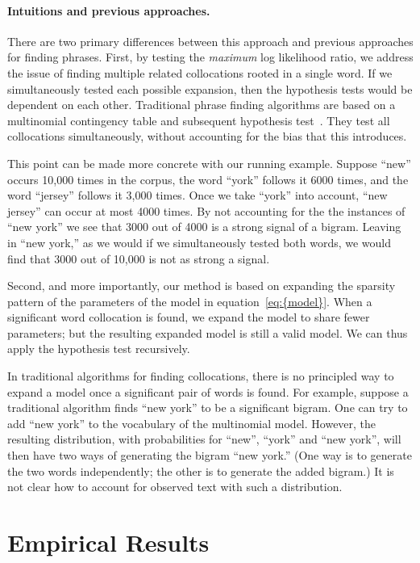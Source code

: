 \documentclass[11pt]{article}
\begin{document}
\paragraph{Intuitions and previous approaches.}

There are two primary differences between this approach and previous
approaches for finding phrases.  First, by testing the
\textit{maximum} log likelihood ratio, we address the issue of finding
multiple related collocations rooted in a single word.  If we
simultaneously tested each possible expansion, then the hypothesis
tests would be dependent on each other.  Traditional phrase finding
algorithms are based on a multinomial contingency table and subsequent
hypothesis test~\citep{Manning:1999}.  They test all collocations
simultaneously, without accounting for the bias that this introduces.

This point can be made more concrete with our running example.  Suppose
``new'' occurs 10,000 times in the corpus, the word ``york'' follows
it 6000 times, and the word ``jersey'' follows it 3,000 times.  Once we
take ``york'' into account, ``new jersey'' can occur at most 4000
times.  By not accounting for the the instances of ``new york'' we see
that 3000 out of 4000 is a strong signal of a bigram.  Leaving in
``new york,'' as we would if we simultaneously tested both words, we
would find that 3000 out of 10,000 is not as strong a signal.

Second, and more importantly, our method is based on expanding the
sparsity pattern of the parameters of the model in {equation~\eqref{eq:{model}}}.  When
a significant word collocation is found, we expand the model to share
fewer parameters; but the resulting expanded model is still a valid
model.  We can thus apply the hypothesis test recursively.

In traditional algorithms for finding collocations, there is no
principled way to expand a model once a significant pair of words is
found.  For example, suppose a traditional algorithm finds ``new
york'' to be a significant bigram.  One can try to add ``new york'' to
the vocabulary of the multinomial model.  However, the resulting
distribution, with probabilities for ``new'', ``york'' and ``new
york'', will then have two ways of generating the bigram ``new york.''
(One way is to generate the two words independently; the other is to
generate the added bigram.)  It is not clear how to account for
observed text with such a distribution.

\section{Empirical Results}
\end{document}
